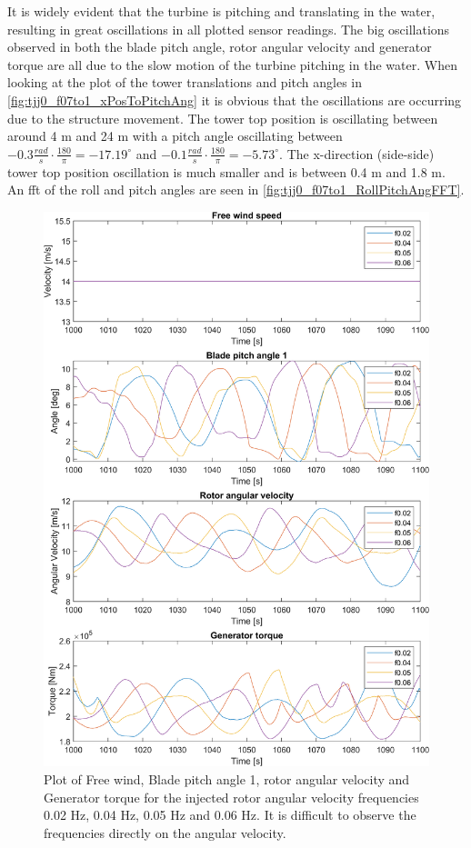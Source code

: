 It is widely evident that the turbine is pitching and translating in the water, resulting in great oscillations in all plotted sensor readings. The big oscillations observed in both the blade pitch angle, rotor angular velocity and generator torque are all due to the slow motion of the turbine pitching in the water. When looking at the plot of the tower translations and pitch angles in \cref{fig:tjj0_f07to1_xPosToPitchAng} it is obvious that the oscillations are occurring due to the structure movement. The tower top position is oscillating between around 4 m and 24 m with a pitch angle oscillating between $ -0.3 \frac{rad}{s} \cdot \frac{180}{\pi} = -17.19 ^{\circ} $ and $ -0.1 \frac{rad}{s} \cdot \frac{180}{\pi} = -5.73 ^{\circ} $. The x-direction (side-side) tower top position oscillation is much smaller and is between 0.4 m and 1.8 m. An fft of the roll and pitch angles are seen in \cref{fig:tjj0_f07to1_RollPitchAngFFT}.
\begin{figure}[ht]
	\centering
	\includegraphics[width=0.8\linewidth]{Graphics/TestResults/tj00/tjj0_f02to06VfreeToMgen.png}
	\caption{Plot of Free wind, Blade pitch angle 1, rotor angular velocity and Generator torque for the injected rotor angular velocity frequencies 0.02 Hz, 0.04 Hz, 0.05 Hz and 0.06 Hz. It is difficult to observe the frequencies directly on the angular velocity.}
	\label{fig:tjj0_f02to06VfreeToMgen}
\end{figure}

